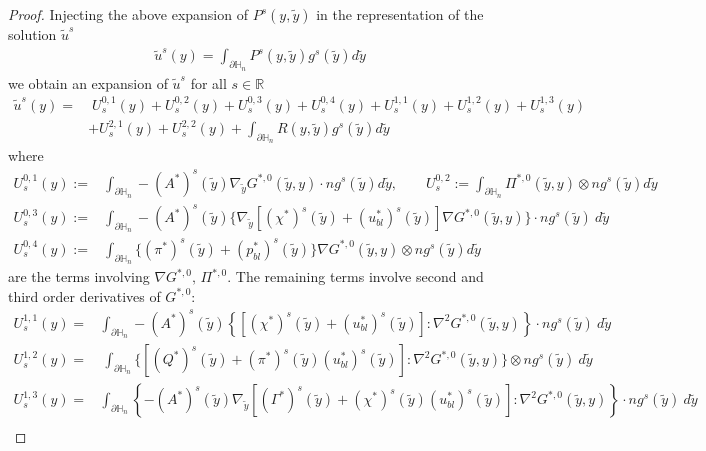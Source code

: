 \documentclass[11pt, reqno]{amsart}
\theoremstyle{definition}
\theoremstyle{remark}
\numberwithin{equation}{section}
\begin{document}
\begin{proof}
	\noindent Injecting the above expansion of $P^s(y,\tilde{y})$ in the representation of the solution $\tilde{u}^s$
\begin{align}
	\tilde{u}^s	(y)=\int_{\partial\mathbb{H}_n} P^s(y,\tilde{y}) g^s(\tilde{y}) d\tilde{y}
\end{align} we obtain an expansion of $\tilde{u}^s$ for all $s\in\mathbb{R}$
\begin{align}
	\tilde{u}^s	(y)=& \; U_s^{0,1}(y) +U_s^{0,2}(y) +U_s^{0,3}(y) +U_s^{0,4}(y) +U_s^{1,1}(y) +U_s^{1,2}(y) +U_s^{1,3}(y) \nonumber\\
	& +U_s^{2,1}(y) +U_s^{2,2}(y)+\int_{\partial\mathbb{H}_n} R(y,\tilde{y}) g^s(\tilde{y}) d\tilde{y} \label{expans_tild_u_s}
\end{align}
where 
\begin{align*}
	U_s^{0,1}(y):=&\int_{\partial\mathbb{H}_n}  -(A^*)^s(\tilde{y}) \nabla_{\!\tilde{y}}G^{*,0}\left(\tilde{y},y \right)\cdot n g^s(\tilde{y})  d\tilde{y},   \qquad U_s^{0,2}:=\int_{\partial\mathbb{H}_n}\Pi^{*,0}( \tilde{y}, y)\otimes n g^s(\tilde{y})  d\tilde{y}   \\
	U_s^{0,3}(y):=&\int_{\partial\mathbb{H}_n}-(A^*)^s(\tilde{y}) \{\nabla_{\!\tilde{y}}\left[(\chi^*)^s \left(\tilde{y} \right)+ (u_{bl}^*)^s\left(\tilde{y} \right)\right] \nabla G^{*,0}\left(\tilde{y},y\right)\}\cdot n g^s(\tilde{y}) \   d\tilde{y}   \\
	U_s^{0,4}(y):=& \int_{\partial\mathbb{H}_n}\{(\pi^*)^s(\tilde{y})+(p_{bl}^*)^s(\tilde{y}) \} \nabla G^{*,0}(\tilde{y}, y)\otimes n  g^s(\tilde{y}) d\tilde{y} 
\end{align*}
are the terms involving $\nabla G^{*,0},\,\Pi^{*,0}$. The remaining terms involve second and third order derivatives of $G^{*,0}$:
\begin{align*}
	U_s^{1,1}(y)=&\int_{\partial\mathbb{H}_n}-(A^*)^s(\tilde{y}) \left\{\left[(\chi^*)^s \left(\tilde{y} \right)+ (u_{bl}^*)^s\left(\tilde{y} \right)\right]:\nabla^2 G^{*,0}\left(\tilde{y},y\right)\right\}\cdot n  g^s(\tilde{y}) \   d\tilde{y}   \\
	U_s^{1,2}(y)=&\ \int_{\partial\mathbb{H}_n}\{[(Q^*)^s(\tilde{y})+(\pi^*)^s (\tilde{y}) (u_{bl}^*)^s(\tilde{y})]:\nabla^2 G^{*,0}(\tilde{y}, y)\}\otimes n g^s(\tilde{y}) \ d\tilde{y} \\
	U_s^{1,3}(y)=&\int_{\partial\mathbb{H}_n}  \left\{-(A^*)^s(\tilde{y}) \nabla_{\!\tilde{y}}\left[(\Gamma^*)^s \left(\tilde{y}\right)+ (\chi^*)^s\left(\tilde{y} \right) (u_{bl}^*)^s\left(\tilde{y} \right)\right]:\nabla^2 G^{*,0}\left(\tilde{y},y \right) 	\right\}\cdot n g^s(\tilde{y})   \  d\tilde{y}   \\

\end{align*}
\end{proof}
\end{document}
